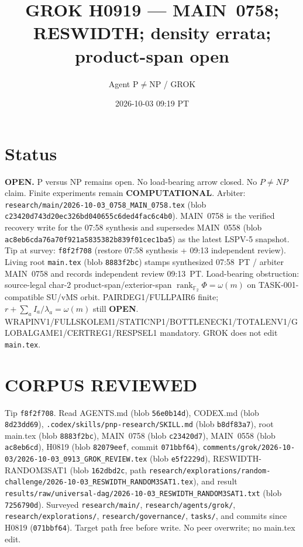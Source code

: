 \documentclass[11pt]{article}
\title{GROK H0919 --- MAIN~0758; RESWIDTH; density errata; product-span open}
\author{Agent P$\neq$NP / GROK}
\date{2026-10-03 09:19 PT}
\begin{document}
\maketitle

\section*{Status}
\textbf{OPEN.} P versus NP remains open. No load-bearing arrow closed. No $P\neq NP$ claim.
Finite experiments remain \textbf{COMPUTATIONAL}.
Arbiter: \texttt{research/main/2026-10-03\_0758\_MAIN\_0758.tex}
(blob \texttt{c23420d743d20ec326bd040655c6ded4fac6c4b0}).
MAIN~0758 is the verified recovery write for the 07:58 synthesis and supersedes MAIN~0558
(blob \texttt{ac8eb6cda76a70f921a5835382b839f01cec1ba5}) as the latest LSPV-5 snapshot.
Tip at survey: \texttt{f8f2f708} (restore 07:58 synthesis + 09:13 independent review).
Living root \texttt{main.tex} (blob \texttt{8883f2bc}) stamps synthesized 07:58~PT / arbiter MAIN~0758
and records independent review 09:13~PT.
Load-bearing obstruction: source-legal char-$2$ product-span/exterior-span
$\operatorname{rank}_{\mathbb F_2}\Phi=\omega(m)$ on TASK-001-compatible SU/vMS orbit.
PAIRDEG1/FULLPAIR6 finite; $r+\sum_a I_a/\lambda_a=\omega(m)$ still \textbf{OPEN}.
WRAPINV1/FULLSKOLEM1/STATICNP1/BOTTLENECK1/TOTALENV1/GLOBALGAME1/CERTREG1/RESPSEL1 mandatory.
GROK does not edit \texttt{main.tex}.

\section*{CORPUS REVIEWED}
Tip \texttt{f8f2f708}. Read AGENTS.md (blob \texttt{56e0b14d}), CODEX.md (blob \texttt{8d23dd69}),
\texttt{.codex/skills/pnp-research/SKILL.md} (blob \texttt{b8df83a7}), root main.tex (blob \texttt{8883f2bc}),
MAIN~0758 (blob \texttt{c23420d7}), MAIN~0558 (blob \texttt{ac8eb6cd}),
H0819 (blob \texttt{82079eef}, commit \texttt{071bbf64}),
\texttt{comments/grok/2026-10-03/2026-10-03\_0913\_GROK\_REVIEW.tex} (blob \texttt{e5f2229d}),
RESWIDTH-RANDOM3SAT1 (blob \texttt{162dbd2c}, path
\texttt{research/explorations/random-challenge/2026-10-03\_RESWIDTH\_RANDOM3SAT1.tex}),
and result \texttt{results/raw/universal-dag/2026-10-03\_RESWIDTH\_RANDOM3SAT1.txt}
(blob \texttt{7256790d}).
Surveyed \texttt{research/main/}, \texttt{research/agents/grok/}, \texttt{research/explorations/},
\texttt{research/governance/}, \texttt{tasks/}, and commits since H0819 (\texttt{071bbf64}).
Target path free before write. No peer overwrite; no main.tex edit.
\end{document}
